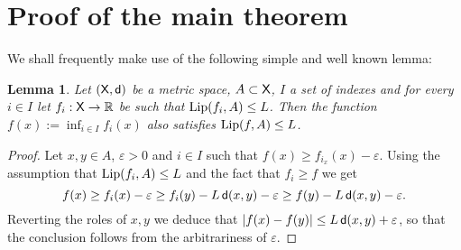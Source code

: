 \documentclass[9pt,reqno]{amsart}
\newtheorem{lem}{Lemma}[section]
\newcommand{\R}{\mathbb{R}}
\newcommand{\sfd}{{\sf d}}
\newcommand{\X}{{\sf X}}
\def\ep{\varepsilon}
\begin{document}
\section{Proof of the main theorem}

We shall frequently make use of the following simple and  well known lemma:

\begin{lem}\label{lem:LLip} Let $(\X,\sfd)$ be a metric space, $A \subset \X$, $I$ a set of indexes and for every $i\in I$ let $f_i:\X\to\R$ be such that ${\rm Lip} (f_i,A)\leq L$. Then the function $f(x):= \inf_{i \in I} f_i(x)$ also satisfies ${\rm Lip} (f,A)\leq L$.
\end{lem}
\begin{proof} Let $x,y \in A$, $\ep>0$ and  $i\in I$ such that $f(x) \geq f_{i_x}(x)-\ep$. Using the assumption  that ${\rm Lip} (f_i,A)\leq L$ and the fact that  $f_{i} \geq f$ we get
\[
f(x) \geq f_{i}(x) - \ep \geq f_{i}(y) - L \, \sfd(x,y)  - \ep \geq f(y) - L \,\sfd(x,y) -\ep. 
\]
Reverting the roles of $x,y$ we deduce that  $|f(x)-f(y)| \leq L\, \sfd(x,y) + \ep$, so that the conclusion follows from the arbitrariness of  $\ep$.
\end{proof}
\end{document}
